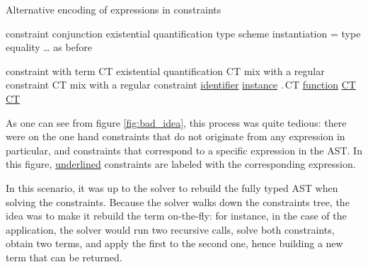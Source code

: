 \documentclass[10pt,a4paper,twoside,titlepage,twocolumn]{article}
\newcommand{\code}[1]{\textbf{\texttt{#1}}}
\begin{document}
\begin{TTCOMPONENT}{Alternative encoding of expressions in constraints\label{fig:bad_idea}}{}
  \let \\ \TTSyntaxAlternative%

         {constraint} \\
  {\co \wedge \co}                     {conjunction} \\
  {\cexists\tvars\co}                  {existential quantification} \\
  {\ccall\evid\ttyp}                   {type scheme instantiation}\\
  {\ttyp = \ttyp}                      {type equality} \\
  {…}                                  {as before}

  \columnbreak %

       {constraint with term} \\
  {\cexists\tvars CT}                  {existential quantification} \\
  {CT \wedge\co}                  {mix with a regular constraint} \\
  {\co\wedge CT}                  {mix with a regular constraint} \\
  {\underline{\evid}}                  {\underline{identifier}} \\
  {\ccall{\underline{\evid}}\ttyp}                  {\underline{instance}} \\
  {\underline{\efun\evar\ttyp}.\,CT}                  {\underline{function}} \\
  {\underline{CT}\,\,\underline{CT}} {\underline{}} \\
  {\underline{}} {\underline{\smash{\code{let}-binding}}}

  \extraspacehack{.07in}
\end{TTCOMPONENT}

As one can see from figure \vref{fig:bad_idea}, this process was quite tedious:
there were on the one hand constraints that do not originate from any expression
in particular, and constraints that correspond to a specific expression in the
AST. In this figure, \underline{underlined} constraints are labeled with the
corresponding expression.

In this scenario, it was up to the solver to rebuild the fully typed AST when
solving the constraints. Because the solver walks down the constraints tree, the
idea was to make it rebuild the term on-the-fly: for instance, in the case of
the application, the solver would run two recursive calls, solve both
constraints, obtain two terms, and apply the first to the second one, hence
building a new term that can be returned.
\end{document}
